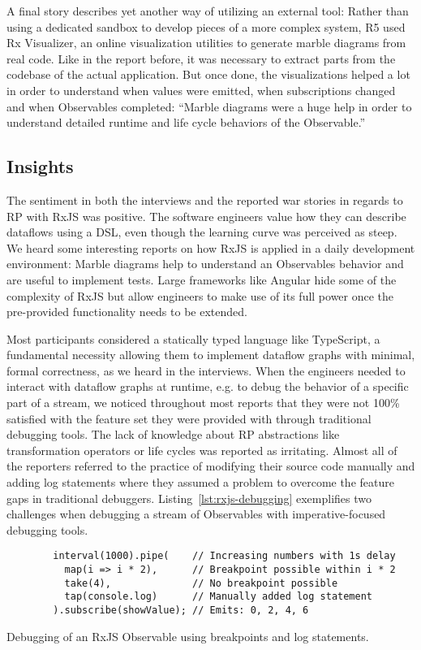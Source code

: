 \documentclass[12pt,a4paper]{article}
\begin{document}
A final story describes yet another way of utilizing an external tool: Rather than using a dedicated sandbox to develop pieces of a more complex system, R5 used Rx Visualizer, an online visualization utilities to generate marble diagrams from real code. Like in the report before, it was necessary to extract parts from the codebase of the actual application. But once done, the visualizations helped a lot in order to understand when values were emitted, when subscriptions changed and when Observables completed: ``Marble diagrams were a huge help in order to understand detailed runtime and life cycle behaviors of the Observable.''

\subsection{Insights}

The sentiment in both the interviews and the reported war stories in regards to RP with RxJS was positive. The software engineers value how they can describe dataflows using a DSL, even though the learning curve was perceived as steep. We heard some interesting reports on how RxJS is applied in a daily development environment: Marble diagrams help to understand  an Observables behavior and are useful to implement tests. Large frameworks like Angular hide some of the complexity of RxJS but allow engineers to make use of its full power once the pre-provided functionality needs to be extended.

Most participants considered a statically typed language like TypeScript, a fundamental necessity allowing them to implement dataflow graphs with minimal, formal correctness, as we heard in the interviews. When the engineers needed to interact with dataflow graphs at runtime, e.g. to debug the behavior of a specific part of a stream, we noticed throughout most reports that they were not 100\% satisfied with the feature set they were provided with through traditional debugging tools. The lack of knowledge about RP abstractions like transformation operators or life cycles was reported as irritating. Almost all of the reporters referred to the practice of modifying their source code manually and adding log statements where they assumed a problem to overcome the feature gaps in traditional debuggers. Listing~\ref{lst:rxjs-debugging} exemplifies two challenges when debugging a stream of Observables with imperative-focused debugging tools.

\begin{listing}[H]
	\begin{verbatim}
		interval(1000).pipe(    // Increasing numbers with 1s delay
		  map(i => i * 2),      // Breakpoint possible within i * 2
		  take(4),              // No breakpoint possible
		  tap(console.log)      // Manually added log statement
		).subscribe(showValue); // Emits: 0, 2, 4, 6
	\end{verbatim}
	\caption{Debugging of an RxJS Observable using breakpoints and log statements.}
	\label{lst:rxjs-debugging}
\end{listing}
\end{document}
